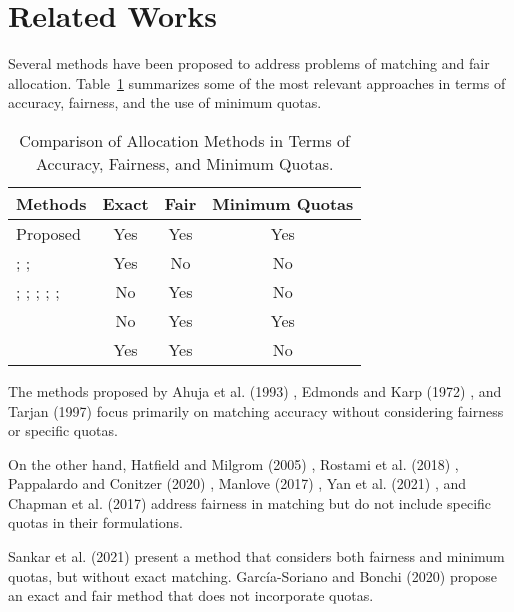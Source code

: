     \section{Related Works}
        Several methods have been proposed to address problems of matching and fair allocation. Table~\ref{tab:related_work} summarizes some of the most relevant approaches in terms of accuracy, fairness, and the use of minimum quotas.
        
        \begin{table}[ht]
          \centering
          \begin{tabular}{lccc}
            \toprule
            Methods & Exact & Fair & Minimum Quotas \\
            \midrule
            Proposed & Yes & Yes & Yes \\
            \cite{ahuja1993network}; \cite{edmonds1972theoretical}; \cite{tarjan1997dynamic} & Yes & No & No \\
            \cite{hatfield2005matching}; \cite{rostami2018matching}; \cite{pappalardo2020combining}; \cite{manlove2017algorithmics}; \cite{yan2021evolutionary}; \cite{chapman2017multi} & No & Yes & No \\
            \cite{sankar2021set} & No & Yes & Yes \\
            \cite{garcia2020fair} & Yes & Yes & No \\
            \bottomrule
          \end{tabular}
          \caption{Comparison of Allocation Methods in Terms of Accuracy, Fairness, and Minimum Quotas.}
          \label{tab:related_work}
        \end{table}
        
        The methods proposed by Ahuja et al. (1993) \cite{ahuja1993network}, Edmonds and Karp (1972) \cite{karp1972reducibility}, and Tarjan (1997) \cite{tarjan1997dynamic} focus primarily on matching accuracy without considering fairness or specific quotas.
        
        On the other hand, Hatfield and Milgrom (2005) \cite{hatfield2005matching}, Rostami et al. (2018) \cite{rostami2018matching}, Pappalardo and Conitzer (2020) \cite{pappalardo2020combining}, Manlove (2017) \cite{manlove2017algorithmics}, Yan et al. (2021) \cite{yan2021evolutionary}, and Chapman et al. (2017) \cite{chapman2017multi} address fairness in matching but do not include specific quotas in their formulations.
        
        Sankar et al. (2021) \cite{sankar2021set} present a method that considers both fairness and minimum quotas, but without exact matching. García-Soriano and Bonchi (2020) \cite{garcia2020fair} propose an exact and fair method that does not incorporate quotas.
        

